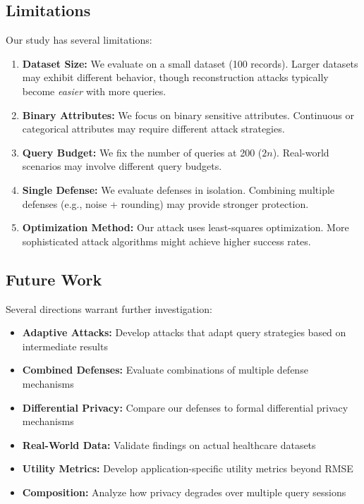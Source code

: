 \documentclass[11pt,letterpaper]{article}
\begin{document}
\subsection{Limitations}

Our study has several limitations:

\begin{enumerate}[leftmargin=*]
    \item \textbf{Dataset Size:} We evaluate on a small dataset (100 records). Larger datasets may exhibit different behavior, though reconstruction attacks typically become \textit{easier} with more queries.
    
    \item \textbf{Binary Attributes:} We focus on binary sensitive attributes. Continuous or categorical attributes may require different attack strategies.
    
    \item \textbf{Query Budget:} We fix the number of queries at 200 ($2n$). Real-world scenarios may involve different query budgets.
    
    \item \textbf{Single Defense:} We evaluate defenses in isolation. Combining multiple defenses (e.g., noise + rounding) may provide stronger protection.
    
    \item \textbf{Optimization Method:} Our attack uses least-squares optimization. More sophisticated attack algorithms might achieve higher success rates.
\end{enumerate}

\subsection{Future Work}

Several directions warrant further investigation:

\begin{itemize}[leftmargin=*]
    \item \textbf{Adaptive Attacks:} Develop attacks that adapt query strategies based on intermediate results
    \item \textbf{Combined Defenses:} Evaluate combinations of multiple defense mechanisms
    \item \textbf{Differential Privacy:} Compare our defenses to formal differential privacy mechanisms
    \item \textbf{Real-World Data:} Validate findings on actual healthcare datasets
    \item \textbf{Utility Metrics:} Develop application-specific utility metrics beyond RMSE
    \item \textbf{Composition:} Analyze how privacy degrades over multiple query sessions
\end{itemize}
\end{document}
